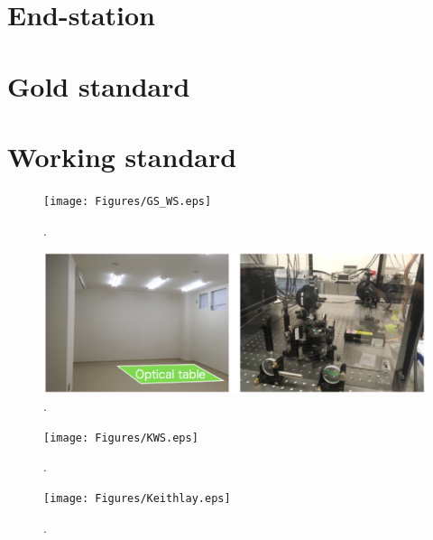 \section{End-station}
\section{Gold standard}
\section{Working standard}

\begin{figure}
\begin{center}
\texttt{[image: Figures/GS\_WS.eps]}
\caption{.} 
\label{fig:GS_WS} 
\end{center}
\end{figure}

\begin{figure}
\begin{center}
\includegraphics[width=14cm]{Figures/Toyama.eps}
\caption{.} 
\label{fig:Toyama} 
\end{center}
\end{figure}

\begin{figure}
\begin{center}
\texttt{[image: Figures/KWS.eps]}
\caption{.} 
\label{fig:KWS} 
\end{center}
\end{figure}

\begin{figure}
\begin{center}
\texttt{[image: Figures/Keithlay.eps]}
\caption{.} 
\label{fig:Keithlay} 
\end{center}
\end{figure}
